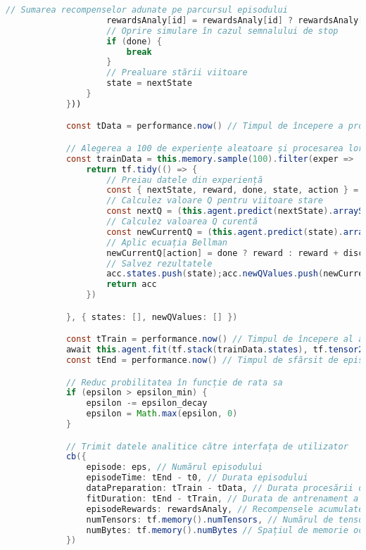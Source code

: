 \begin{lstlisting}[language=Java, caption={Structura clasei Trainer}]
                    // Sumarea recompenselor adunate pe parcursul episodului
                    rewardsAnaly[id] = rewardsAnaly[id] ? rewardsAnaly[id] + reward : reward
                    // Oprire simulare în cazul semnalului de stop
                    if (done) {
                        break
                    }
                    // Prealuare stării viitoare
                    state = nextState
                }
            }))

            const tData = performance.now() // Timpul de începere a procesării de date

            // Alegerea a 100 de experiențe aleatoare și procesarea lor
            const trainData = this.memory.sample(100).filter(exper => !exper.state.isDisposed && !exper.nextState.isDisposed).reduce((acc, exper) => {
                return tf.tidy(() => {
                    // Preiau datele din experiență
                    const { nextState, reward, done, state, action } = exper
                    // Calculez valoare Q pentru viitoare stare
                    const nextQ = (this.agent.predict(nextState).arraySync())[0]
                    // Calculez valoarea Q curentă
                    const newCurrentQ = (this.agent.predict(state).arraySync())[0]
                    // Aplic ecuația Bellman
                    newCurrentQ[action] = done ? reward : reward + discount * Math.max(...nextQ)
                    // Salvez rezultatele
                    acc.states.push(state);acc.newQValues.push(newCurrentQ)
                    return acc
                })

            }, { states: [], newQValues: [] })

            const tTrain = performance.now() // Timpul de începere al antrenării rețelei neuronale
            await this.agent.fit(tf.stack(trainData.states), tf.tensor2d(trainData.newQValues))
            const tEnd = performance.now() // Timpul de sfărsit de episod

            // Reduc probilitatea în funcție de rata sa 
            if (epsilon > epsilon_min) {
                epsilon -= epsilon_decay
                epsilon = Math.max(epsilon, 0)
            }

            // Trimit datele analitice către interfața de utilizator 
            cb({
                episode: eps, // Numărul episodului
                episodeTime: tEnd - t0, // Durata episodului
                dataPreparation: tTrain - tData, // Durata procesării de date
                fitDuration: tEnd - tTrain, // Durata de antrenament a    rețelei
                episodeRewards: rewardsAnaly, // Recompensele acumulate
                numTensors: tf.memory().numTensors, // Numărul de tensori
                numBytes: tf.memory().numBytes // Spațiul de memorie ocupat
            })


\end{lstlisting}
